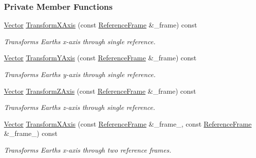 \subsubsection*{Private Member Functions}
\begin{DoxyCompactItemize}
\item 
\hyperlink{classosse_1_1collaborate_1_1_vector}{Vector} \hyperlink{classosse_1_1collaborate_1_1_reference_frame_a560f99ed2e6d7298cffbfbab84fe4a94}{Transform\+X\+Axis} (const \hyperlink{classosse_1_1collaborate_1_1_reference_frame}{Reference\+Frame} \&\+\_\+frame) const
\begin{DoxyCompactList}\small\item\em Transforms Earth\textquotesingle{}s x-\/axis through single reference. \end{DoxyCompactList}\item 
\hyperlink{classosse_1_1collaborate_1_1_vector}{Vector} \hyperlink{classosse_1_1collaborate_1_1_reference_frame_a417ac4bad191e12f1aaff76e413f339e}{Transform\+Y\+Axis} (const \hyperlink{classosse_1_1collaborate_1_1_reference_frame}{Reference\+Frame} \&\+\_\+frame) const
\begin{DoxyCompactList}\small\item\em Transforms Earth\textquotesingle{}s y-\/axis through single reference. \end{DoxyCompactList}\item 
\hyperlink{classosse_1_1collaborate_1_1_vector}{Vector} \hyperlink{classosse_1_1collaborate_1_1_reference_frame_a7fc4ac945236cd63ed4c3bddd5149594}{Transform\+Z\+Axis} (const \hyperlink{classosse_1_1collaborate_1_1_reference_frame}{Reference\+Frame} \&\+\_\+frame) const
\begin{DoxyCompactList}\small\item\em Transforms Earth\textquotesingle{}s z-\/axis through single reference. \end{DoxyCompactList}\item 
\hyperlink{classosse_1_1collaborate_1_1_vector}{Vector} \hyperlink{classosse_1_1collaborate_1_1_reference_frame_a2172488c952b75bca793b4eca308b50b}{Transform\+X\+Axis} (const \hyperlink{classosse_1_1collaborate_1_1_reference_frame}{Reference\+Frame} \&\+\_\+frame\+\_, const \hyperlink{classosse_1_1collaborate_1_1_reference_frame}{Reference\+Frame} \&\+\_\+frame\+\_) const
\begin{DoxyCompactList}\small\item\em Transforms Earth\textquotesingle{}s x-\/axis through two reference frames. \end{DoxyCompactList}\item 

\end{DoxyCompactItemize}
